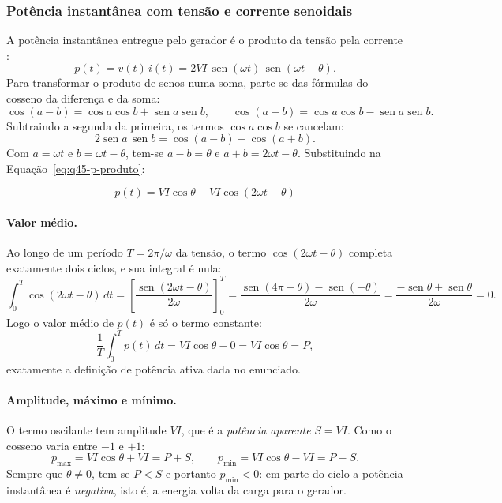 \documentclass[a4paper,11pt]{article}
\providecommand{\sen}{\operatorname{sen}}   %
\numberwithin{equation}{section}
\numberwithin{figure}{section}
\numberwithin{table}{section}
\begin{document}
\subsubsection{Potência instantânea com tensão e corrente senoidais}

A potência instantânea entregue pelo gerador é o produto da tensão pela
corrente \cite{stevenson1986elementos}:
\begin{equation}
  p(t) = v(t)\,i(t) = 2VI\,\sen(\omega t)\,\sen(\omega t - \theta).
  \label{eq:q45-p-produto}
\end{equation}
Para transformar o produto de senos numa soma, parte-se das fórmulas do
cosseno da diferença e da soma:
\[
  \cos(a - b) = \cos a\cos b + \sen a\sen b,
  \qquad
  \cos(a + b) = \cos a\cos b - \sen a\sen b .
\]
Subtraindo a segunda da primeira, os termos $\cos a\cos b$ se cancelam:
\begin{equation}
  2\sen a\,\sen b = \cos(a - b) - \cos(a + b).
  \label{eq:q45-identidade}
\end{equation}
Com $a = \omega t$ e $b = \omega t - \theta$, tem-se $a - b = \theta$ e $a +
b = 2\omega t - \theta$. Substituindo na Equação~\eqref{eq:q45-p-produto}:
\begin{conceito}[title=Potência instantânea]
  \begin{equation}
    p(t) = VI\cos\theta - VI\cos(2\omega t - \theta)
    \label{eq:q45-p}
  \end{equation}
\end{conceito}

\paragraph{Valor médio.} Ao longo de um período $T = 2\pi/\omega$ da tensão,
o termo $\cos(2\omega t - \theta)$ completa exatamente dois ciclos, e sua
integral é nula:
\[
  \int_0^T \cos(2\omega t - \theta)\,dt
  = \left[\frac{\sen(2\omega t - \theta)}{2\omega}\right]_0^T
  = \frac{\sen(4\pi - \theta) - \sen(-\theta)}{2\omega}
  = \frac{-\sen\theta + \sen\theta}{2\omega} = 0 .
\]
Logo o valor médio de $p(t)$ é só o termo constante:
\[
  \frac{1}{T}\int_0^T p(t)\,dt = VI\cos\theta - 0 = VI\cos\theta = P,
\]
exatamente a definição de potência ativa dada no enunciado.

\paragraph{Amplitude, máximo e mínimo.} O termo oscilante tem amplitude
$VI$, que é a \emph{potência aparente} $S = VI$. Como o cosseno varia entre
$-1$ e $+1$:
\begin{equation}
  p_{\max} = VI\cos\theta + VI = P + S,
  \qquad
  p_{\min} = VI\cos\theta - VI = P - S .
  \label{eq:q45-max-min}
\end{equation}
Sempre que $\theta \neq 0$, tem-se $P < S$ e portanto $p_{\min} < 0$: em
parte do ciclo a potência instantânea é \emph{negativa}, isto é, a energia
volta da carga para o gerador.
\end{document}
